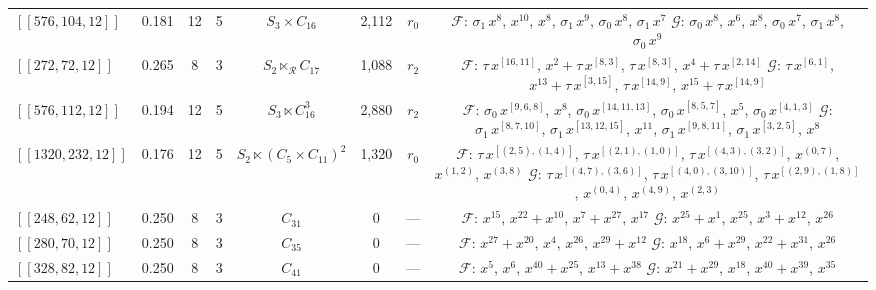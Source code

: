 \begin{table}[t]
\begin{tabular}{llcccccc}
$[[576, 104, 12]]$ & 0.181 & 12 & 5 & $S_{3} \times C_{16}$ & 2,112 & $r_0$ & \parbox[t]{0.46\textwidth}{\raggedright $\mathcal{F}$: $\sigma_1\,x^{8}$, $x^{10}$, $x^{8}$, $\sigma_1\,x^{9}$, $\sigma_0\,x^{8}$, $\sigma_1\,x^{7}$ \\ $\mathcal{G}$: $\sigma_0\,x^{8}$, $x^{6}$, $x^{8}$, $\sigma_0\,x^{7}$, $\sigma_1\,x^{8}$, $\sigma_0\,x^{9}$} \\
$[[272, 72, 12]]$ & 0.265 & 8 & 3 & $S_{2} \ltimes_{\mathcal{R}} C_{17}$ & 1,088 & $r_2$ & \parbox[t]{0.46\textwidth}{\raggedright $\mathcal{F}$: $\tau\,x^{[16,11]}$, $x^{2}{+}\tau\,x^{[8,3]}$, $\tau\,x^{[8,3]}$, $x^{4}{+}\tau\,x^{[2,14]}$ \\ $\mathcal{G}$: $\tau\,x^{[6,1]}$, $x^{13}{+}\tau\,x^{[3,15]}$, $\tau\,x^{[14,9]}$, $x^{15}{+}\tau\,x^{[14,9]}$} \\
$[[576, 112, 12]]$ & 0.194 & 12 & 5 & $S_{3} \ltimes C_{16}^{3}$ & 2,880 & $r_2$ & \parbox[t]{0.46\textwidth}{\raggedright $\mathcal{F}$: $\sigma_0\,x^{[9,6,8]}$, $x^{8}$, $\sigma_0\,x^{[14,11,13]}$, $\sigma_0\,x^{[8,5,7]}$, $x^{5}$, $\sigma_0\,x^{[4,1,3]}$ \\ $\mathcal{G}$: $\sigma_1\,x^{[8,7,10]}$, $\sigma_1\,x^{[13,12,15]}$, $x^{11}$, $\sigma_1\,x^{[9,8,11]}$, $\sigma_1\,x^{[3,2,5]}$, $x^{8}$} \\
$[[1320, 232, 12]]$ & 0.176 & 12 & 5 & $S_{2} \ltimes (C_{5}\!\times\!C_{11})^{2}$ & 1,320 & $r_0$ & \parbox[t]{0.46\textwidth}{\raggedright $\mathcal{F}$: $\tau\,x^{[(2,5),(1,4)]}$, $\tau\,x^{[(2,1),(1,0)]}$, $\tau\,x^{[(4,3),(3,2)]}$, $x^{(0,7)}$, $x^{(1,2)}$, $x^{(3,8)}$ \\ $\mathcal{G}$: $\tau\,x^{[(4,7),(3,6)]}$, $\tau\,x^{[(4,0),(3,10)]}$, $\tau\,x^{[(2,9),(1,8)]}$, $x^{(0,4)}$, $x^{(4,9)}$, $x^{(2,3)}$} \\
$[[248, 62, 12]]$ & 0.250 & 8 & 3 & $C_{31}$ & 0 & --- & \parbox[t]{0.46\textwidth}{\raggedright $\mathcal{F}$: $x^{15}$, $x^{22}{+}x^{10}$, $x^{7}{+}x^{27}$, $x^{17}$ \\ $\mathcal{G}$: $x^{25}{+}x^{1}$, $x^{25}$, $x^{3}{+}x^{12}$, $x^{26}$} \\
$[[280, 70, 12]]$ & 0.250 & 8 & 3 & $C_{35}$ & 0 & --- & \parbox[t]{0.46\textwidth}{\raggedright $\mathcal{F}$: $x^{27}{+}x^{20}$, $x^{4}$, $x^{26}$, $x^{29}{+}x^{12}$ \\ $\mathcal{G}$: $x^{18}$, $x^{6}{+}x^{29}$, $x^{22}{+}x^{31}$, $x^{26}$} \\
$[[328, 82, 12]]$ & 0.250 & 8 & 3 & $C_{41}$ & 0 & --- & \parbox[t]{0.46\textwidth}{\raggedright $\mathcal{F}$: $x^{5}$, $x^{6}$, $x^{40}{+}x^{25}$, $x^{13}{+}x^{38}$ \\ $\mathcal{G}$: $x^{21}{+}x^{29}$, $x^{18}$, $x^{40}{+}x^{39}$, $x^{35}$} \\

\end{tabular}
\end{table}
